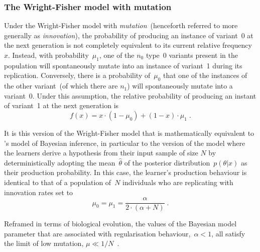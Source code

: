 \subsubsection{The Wright-Fisher model with mutation}
\label{sec:realigriffithsequivalence}


Under the Wright-Fisher model with \emph{mutation}~(henceforth referred to more generally as \emph{innovation}), the probability of producing an instance of variant~$0$ at the next generation is not completely equivalent to its current relative frequency~$x$. Instead, with probability~$\mu_{1}$, one of the $n_0$ type~0 variants present in the population will spontaneously mutate into an instance of variant~1 during its replication. Conversely, there is a probability of~$\mu_{0}$ that one of the instances of the other variant~(of which there are $n_1$) will spontaneously mutate into a variant~0. Under this assumption, the relative probability of producing an instant of variant~1 at the next generation is
\begin{equation}\label{eq:mutation}
f(x) = x\cdot(1-\mu_0) + (1-x)\cdot\mu_1 \;.
\end{equation}

It is this version of the Wright-Fisher model that is mathematically equivalent to \citeauthor{Reali2010}'s model of Bayesian inference, in particular to the version of the model where the learners derive a hypothesis from their input sample of size $N$ by deterministically adopting the mean~$\hat{\theta}$ of the posterior distribution~$p(\theta|x)$ as their production probability. In this case, the learner's production behaviour is identical to that of a population of~$N$ individuals who are replicating with innovation rates set to
\begin{equation}\label{eq:realigriffithsequivalence}
\mu_0 = \mu_1 = \frac{\alpha}{2\cdot(\alpha+N)}\;.
\end{equation}


Reframed in terms of biological evolution, the values of the Bayesian model parameter that are associated with regularisation behaviour,~$\alpha < 1$, all satisfy the limit of low mutation, $\mu \ll 1/N$~\citep{Tarnita2014}.

